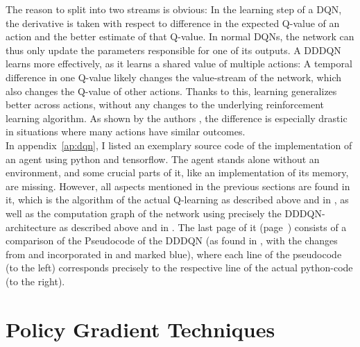 The reason to split into two streams is obvious: In the learning step of a DQN, the derivative is taken with respect to difference in the expected Q-value of an action and the better estimate of that Q-value. In normal DQNs, the network can thus only update the parameters responsible for one of its outputs. A DDDQN learns more effectively, as it learns a shared value of multiple actions: A temporal difference in one Q-value likely changes the value-stream of the network, which also changes the Q-value of other actions. Thanks to this, learning generalizes better across actions, without any changes to the underlying reinforcement learning algorithm. As shown by the authors \cite{wang_dueling_2015}, the difference is especially drastic in situations where many actions have similar outcomes.\\


In appendix~\ref{ap:dqn}, I listed an exemplary source code of the implementation of an agent using python and tensorflow. The agent stands alone without an environment, and some crucial parts of it, like an implementation of its memory, are missing. However, all aspects mentioned in the previous sections are found in it, which is the algorithm of the actual Q-learning as described above and in \cite{van_hasselt_deep_2015}, as well as the computation graph of the network using precisely the DDDQN-architecture as described above and in \cite{wang_dueling_2015}. The last page of it (page~\pageref{ap:dqn_comparison}) consists of a comparison of the Pseudocode of the DDDQN (as found in \cite{mnih_human-level_2015}, with the changes from \cite{van_hasselt_deep_2015} and \cite{lillicrap_continuous_2015} incorporated in and marked blue), where each line of the pseudocode (to the left) corresponds precisely to the respective line of the actual python-code (to the right).




\section{Policy Gradient Techniques}

